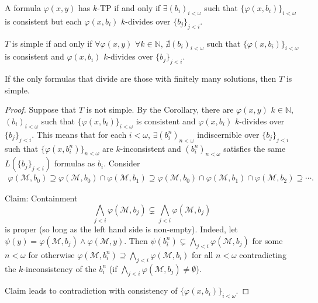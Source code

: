 \documentclass{article}
\begin{document}
\begin{prop}
  A formula $\varphi(x,y)$ has $k$-TP if and only if $\exists (b_i)_{i < \omega}$ such that $\{\varphi(x,b_i)\}_{i < \omega}$ is consistent but each $\varphi(x,b_i)$ $k$-divides over $\{b_j\}_{j<i}$.
\end{prop}
\begin{cor}
  $T$ is simple  if and only if $\forall \varphi(x,y)$ $\forall k \in \mathbb{N}$, $\nexists (b_i)_{i < \omega}$ such that $\{\varphi(x,b_i)\}_{i<\omega}$ is consistent and $\varphi(x,b_i)$ $k$-divides over $\{b_j\}_{j<i}$.
\end{cor}
\begin{cor}
  If the only formulas that divide are those with finitely many solutions, then $T$ is simple.
\end{cor}
\begin{proof}
  Suppose that $T$ is not simple. By the Corollary,
  there are $\varphi(x,y)$ $k \in \mathbb{N}$, $(b_i)_{i < \omega}$ such that $\{\varphi(x,b_i)\}_{i<\omega}$ is consistent and $\varphi(x,b_i)$ $k$-divides over $\{b_j\}_{j < i}$. This means that for each $i < \omega$, $\exists (b_i^n)_{n < \omega}$ indiscernible over $\{b_j\}_{j < i}$ such that $\{\varphi(x,b_i^n)\}_{n < \omega}$ are $k$-inconsistent and $(b_i^n)_{n<\omega}$ satisfies the same $L(\{b_j\}_{j < i})$ formulas as $b_i$.
  Consider
  \begin{align*}
    \varphi(\mathcal{M},b_0) \supseteq \varphi(\mathcal{M},b_0) \cap \varphi(\mathcal{M},b_1) \supseteq \varphi(\mathcal{M},b_0) \cap \varphi(\mathcal{M},b_1) \cap \varphi(\mathcal{M},b_2) \supseteq \dotsb.
  \end{align*}

  Claim: Containment
  \begin{equation*}
    \bigwedge_{j < i} \varphi(\mathcal{M},b_j) \subsetneq \bigwedge_{j < i} \varphi(\mathcal{M},b_j)
  \end{equation*}
  is proper (so long as the left hand side is non-empty).
  Indeed, let $\psi(y) = \varphi(\mathcal{M},b_j) \wedge \varphi( \mathcal{M}, y)$.
  Then $\psi(b_i^n) \subsetneq \bigwedge_{j < i} \varphi( \mathcal{M} , b_j) $ for some $n < \omega$ for otherwise $\varphi( \mathcal{M} , b_i^n) \supseteq \bigwedge_{j < i} \varphi(\mathcal{M }, b_i)$
  for all $n < \omega$ contradicting the $k$-inconsistency of the $b_i^n$ (if $\bigwedge_{j < i} \varphi( \mathcal{M},b_j) \neq \emptyset$).

  Claim leads to contradiction with consistency of $\{\varphi(x,b_i)\}_{i < \omega}$.
\end{proof}
\end{document}
